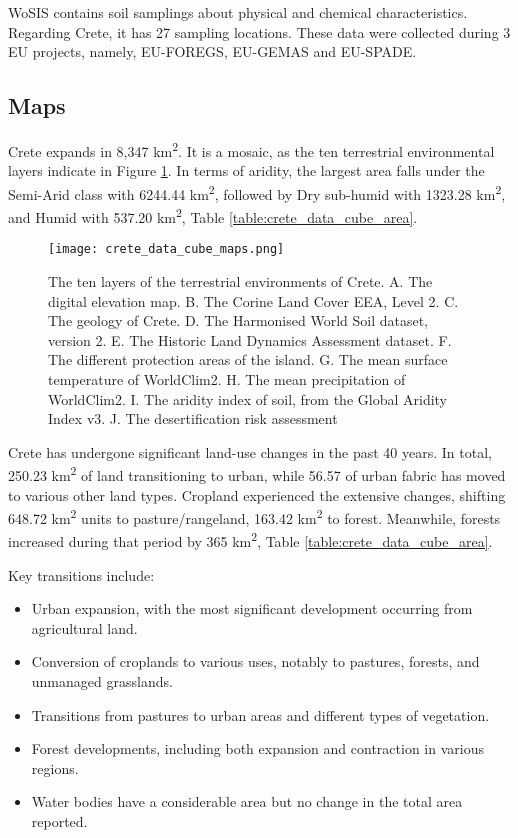 WoSIS contains soil samplings about physical and chemical characteristics. Regarding 
Crete, it has 27 sampling locations. These data were collected during 3 EU projects, namely,
EU-FOREGS, EU-GEMAS and EU-SPADE.

\subsection{Maps}

Crete expands in 8,347 km\textsuperscript{2}. It is a mosaic, as the ten
terrestrial environmental layers indicate in Figure \ref{fig:crete_data_cube_map}.
In terms of aridity, the largest area falls under the Semi-Arid class with 6244.44 km\textsuperscript{2},
followed by Dry sub-humid with 1323.28 km\textsuperscript{2}, and Humid with 537.20 km\textsuperscript{2}, Table \ref{table:crete_data_cube_area}.

\begin{figure}[hbt!] 
    \centering\texttt{[image: crete\_data\_cube\_maps.png]}
    \caption[Crete data cube]{The ten layers of the terrestrial environments of Crete.
    A. The digital elevation map. B. The Corine Land Cover EEA, Level 2.
    C. The geology of Crete. D. The Harmonised World Soil dataset, version 2.
    E. The Historic Land Dynamics Assessment dataset. F. The different protection areas of the island.
    G. The mean surface temperature of WorldClim2. H. The mean precipitation of  WorldClim2.
    I. The aridity index of soil, from the Global Aridity Index v3. J. The desertification risk assessment}
    \label{fig:crete_data_cube_map}
\end{figure}

Crete has undergone significant land-use changes in the past 40 years. In total, 250.23 km\textsuperscript{2}
of land transitioning to urban, while 56.57 of urban fabric has moved to various other land types.
Cropland experienced the extensive changes, shifting 648.72 km\textsuperscript{2}
units to pasture/rangeland, 163.42 km\textsuperscript{2} to forest.
Meanwhile, forests increased during that period by 365 km\textsuperscript{2}, Table \ref{table:crete_data_cube_area}.

Key transitions include:
\begin{itemize}
    \item Urban expansion, with the most significant development occurring from agricultural land.
    \item Conversion of croplands to various uses, notably to pastures, forests, and unmanaged grasslands.
    \item Transitions from pastures to urban areas and different types of vegetation.
    \item Forest developments, including both expansion and contraction in various regions.
    \item Water bodies have a considerable area but no change in the total area reported.
\end{itemize}

